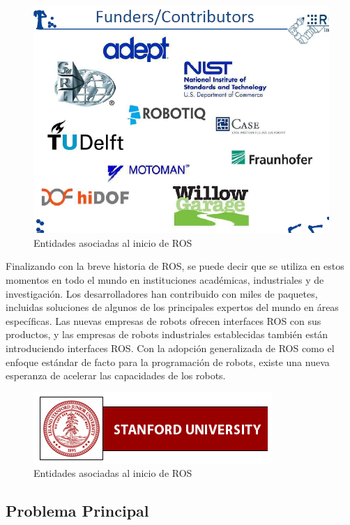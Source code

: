         \begin{figure}[htbp]
            \centering
            \includegraphics[width=0.65\linewidth]{Main/Chapter3/Images3/3-4/entidade-asociadas-al-inicio-de-ros-2.png}
            \caption{Entidades asociadas al inicio de ROS} 
            \label{f:Cap3-4_entidades_inicio_ros_33364}
        \end{figure}    
        
        Finalizando con la breve historia de ROS, se puede decir que se utiliza en estos momentos en todo el mundo en instituciones académicas, industriales y de investigación. Los desarrolladores han contribuido con miles de paquetes, incluidas soluciones de algunos de los principales expertos del mundo en áreas específicas. Las nuevas empresas de robots ofrecen interfaces ROS con sus productos, y las empresas de robots industriales establecidas también están introduciendo interfaces ROS. Con la adopción generalizada de ROS como el enfoque estándar de facto para la programación de robots, existe una nueva esperanza de acelerar las capacidades de los robots.
        
        \begin{figure}[htbp]
            \centering
            \includegraphics[width=0.4\linewidth]{Main/Chapter3/Images3/3-4/entidade-asociadas-al-inicio-de-ros-1.png}
            \caption{Entidades asociadas al inicio de ROS} 
            \label{f:Cap3-4_entidades_inicio_ros_32}
        \end{figure}

    \newpage

    \subsection{Problema Principal}
    
